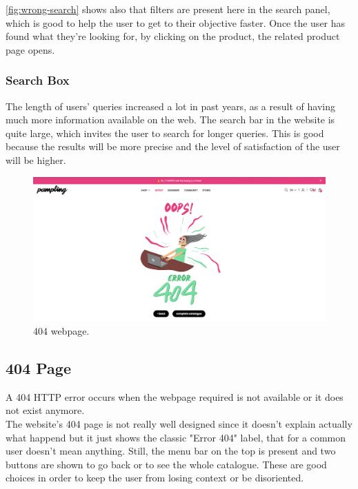 \cref{fig:wrong-search} shows also that filters are present here in the search panel, which is good to 
help the user to get to their objective faster.
Once the user has found what they're looking for, by clicking on the product, the related product page opens.

\subsubsection{Search Box}
The length of users' queries increased a lot in past years, as a result of having much more information available on the web.
The search bar in the website is quite large, which invites the user to search for longer queries. This is good because 
the results will be more precise and the level of satisfaction of the user will be higher. 

\begin{figure}[h!]
	\centering
	\includegraphics[scale=0.225]{images/404.png}
	\caption{404 webpage.}
	\label{fig:404}
\end{figure}
\subsection{404 Page}

A 404 HTTP error occurs when the webpage required is not available or it does not exist anymore. \\
The website's 404 page is not really well designed since it doesn't explain actually what happend but it just shows the
classic "Error 404" label, that for a common user doesn't mean anything.
Still, the menu bar on the top is present and two buttons are shown to go back or to see the whole catalogue.
These are good choices in order to keep the user from losing context or be disoriented.

